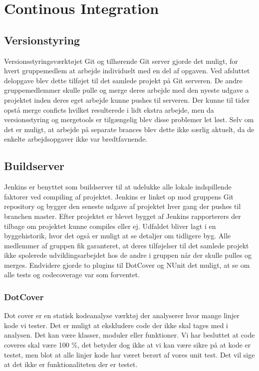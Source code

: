 \thispagestyle{fancy}
\chapter{Continous Integration}
\label{chp:contintegration}

\section{Versionstyring}
Versionsstyringsværktøjet Git og tilhørende Git server gjorde det muligt, for hvert gruppemedlem at arbejde individuelt med en del af opgaven. Ved afsluttet delopgave blev dette tilføjet til det samlede projekt på Git serveren. De andre gruppemedlemmer skulle pulle og merge deres arbejde med den nyeste udgave a projektet inden deres eget arbejde kunne pushes til serveren. Der kunne til tider opstå merge conficts hvilket resulterede i lidt ekstra arbejde, men da versionsstyring og mergetools er tilgængelig blev disse problemer let løst. Selv om det er muligt, at arbejde på separate brances blev dette ikke særlig aktuelt, da de enkelte arbejdsopgaver ikke var bredtfavnende.   

\section{Buildserver}
Jenkins er benyttet som buildserver til at udelukke alle lokale indspillende faktorer ved compiling af projektet. Jenkins er linket op mod gruppens Git repository og bygger den seneste udgave af projektet hver gang der pushes til branchen master. Efter projektet er blevet bygget af Jenkins rapporterers der tilbage om projektet kunne compiles eller ej. Udfaldet bliver lagt i en byggehistorik, hvor det også er muligt at se detaljer om tidligere byg. Alle medlemmer af gruppen fik garanteret, at deres tilføjelser til det samlede projekt ikke spolerede udviklingsarbejdet hos de andre i gruppen når der skulle pulles og merges. Endvidere gjorde to plugins til DotCover og NUnit det muligt, at se om alle tests og codecoverage var som forventet.

\subsection{DotCover}
Dot cover er en statisk kodeanalyse værktøj der analyserer hvor mange linjer kode vi tester.  Det er muligt at ekskludere code der ikke skal tages med i analysen. Det kan være klasser, moduler eller funktioner. Vi har besluttet at code coveres skal være 100 \%, det betyder dog ikke at vi kan være sikre på at kode er testet, men blot at alle linjer kode har været berørt af vores unit test. Det vil sige at det ikke er funktionaliteten der er testet.


